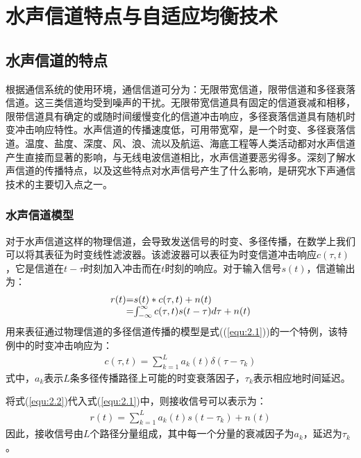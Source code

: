 %
\chapter{水声信道特点与自适应均衡技术}
\thispagestyle{empty}

\section{水声信道的特点}
根据通信系统的使用环境，通信信道可分为：无限带宽信道，限带信道和多径衰落信道\citep{ProakisB2001}。这三类信道均受到噪声的干扰。无限带宽信道具有固定的信道衰减和相移，限带信道具有确定的或随时间缓慢变化的信道冲击响应，多径衰落信道具有随机时变冲击响应特性。水声信道的传播速度低，可用带宽窄，是一个时变、多径衰落信道。温度、盐度、深度、风、浪、流以及航运、海底工程等人类活动都对水声信道产生直接而显著的影响，与无线电波信道相比，水声信道要恶劣得多。深刻了解水声信道的传播特点，以及这些特点对水声信号产生了什么影响，是研究水下声通信技术的主要切入点之一。
\subsection{水声信道模型}
对于水声信道这样的物理信道，会导致发送信号的时变、多径传播，在数学上我们可以将其表征为时变线性滤波器。该滤波器可以表征为时变信道冲击响应$c(\tau,t)$，它是信道在$t-\tau$时刻加入冲击而在$t$时刻的响应。对于输入信号$s(t)$，信道输出为：
\begin{eqnarray}
    \begin{array}{l@{\mbox{=}}l}
        r(t)&s(t)*c(\tau,t)+n(t)\\
        &\int_{-\infty}^{\infty}c(\tau,t)s(t-\tau)d\tau+n(t)\\
    \end{array}
    \label{equ:2.1}
\end{eqnarray}
用来表征通过物理信道的多径信道传播的模型是式((\ref{equ:2.1}))的一个特例，该特例中的时变冲击响应为：
\begin{eqnarray}
    c(\tau,t)=\sum_{k=1}^La_k(t)\delta(\tau-\tau_k)
    \label{equ:2.2}
\end{eqnarray}
式中，$a_k$表示$L$条多径传播路径上可能的时变衰落因子，$\tau_k$表示相应地时间延迟。

将式(\ref{equ:2.2})代入式(\ref{equ:2.1})中，则接收信号可以表示为：
\begin{eqnarray}
    r(t)=\sum_{k=1}^La_k(t)s(t-\tau_k)+n(t)
    \label{equ:2.3}
\end{eqnarray}
因此，接收信号由$L$个路径分量组成，其中每一个分量的衰减因子为$a_k$，延迟为$\tau_k$。

